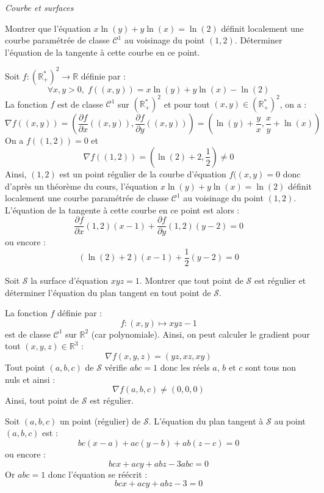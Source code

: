 \documentclass[a4paper,10pt]{report}
\begin{document}
\medskip

\begin{center}
\textit{{ {\large Courbe et surfaces}}}
\end{center}

\medskip

\begin{Exa} Montrer que l'équation $x\ln(y)+y \ln(x) = \ln(2)$ définit localement une courbe paramétrée de classe $\mathcal{C}^1$ au voisinage du point $(1,2)$. Déterminer l'équation de la tangente à cette courbe en ce point.
\end{Exa}

\corr Soit $f : (\mathbb{R}_+^*)^2 \rightarrow \mathbb{R}$ définie par :
$$ \forall x,y>0, \; f((x,y))= x\ln(y)+y \ln(x) - \ln(2)$$
La fonction $f$ est de classe $\mathcal{C}^1$ sur  $(\mathbb{R}_+^*)^2$ et pour tout $(x,y) \in  (\mathbb{R}_+^*)^2$, on a :
$$ \nabla f ((x,y)) = \left( \dfrac{\partial f}{\partial x} ((x,y)),  \dfrac{\partial f}{\partial y} ((x,y)) \right) = \left( \ln(y) + \dfrac{y}{x}, \dfrac{x}{y} + \ln(x) \right)$$
On a $f((1,2))= 0$ et
$$ \nabla f ((1,2)) = \left( \ln(2)+2, \dfrac{1}{2} \right) \neq 0$$
Ainsi, $(1,2)$ est un point régulier de la courbe d'équation $f((x,y)=0$ donc d'après un théorème du cours, l'équation $x\ln(y)+y \ln(x) = \ln(2)$ définit localement une courbe paramétrée de classe $\mathcal{C}^1$ au voisinage du point $(1,2)$. L'équation de la tangente à cette courbe en ce point est alors :
$$  \dfrac{\partial f}{\partial  x}(1,2)(x-1) + \dfrac{\partial f}{\partial y}(1,2) (y-2)=0$$
ou encore :
$$  (\ln(2)+2) (x-1) + \dfrac{1}{2} (y-2)=0$$

\begin{Exa} Soit $\mathcal{S}$ la surface d'équation $xyz=1$. Montrer que tout point de $\mathcal{S}$ est régulier et déterminer l'équation du plan tangent en tout point de $\mathcal{S}$.
\end{Exa}

\corr La fonction $f$ définie par :
$$ f : (x,y) \mapsto xyz-1$$
est de classe $\mathcal{C}^1$ sur $\mathbb{R}^2$ (car polynomiale). Ainsi, on peut calculer le gradient pour tout $(x,y,z) \in \mathbb{R}^3$ :
$$ \nabla f(x,y,z)=(yz,xz,xy)$$
Tout point $(a,b,c)$ de $\mathcal{S}$ vérifie $abc=1$ donc les réels $a$, $b$ et $c$ sont tous non nuls et ainsi :
$$  \nabla f(a,b,c) \neq (0,0,0)$$
Ainsi, tout point de $\mathcal{S}$ est régulier. 

\medskip

\noindent Soit $(a,b,c)$ un point (régulier) de $\mathcal{S}$. L'équation du plan tangent à $\mathcal{S}$ au point $(a,b,c)$ est :
$$ bc(x-a)+ac(y-b)+ab(z-c)=0$$
ou encore :
$$ bcx+acy+abz -3abc=0$$
Or $abc=1$ donc l'équation se réécrit :
$$ bcx+acy+abz -3=0$$
\end{document}

